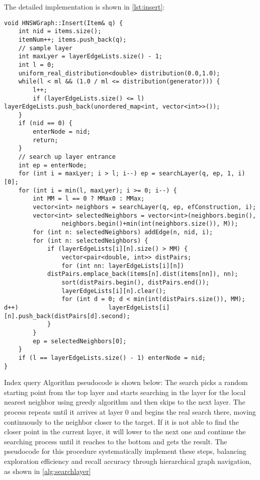 \documentclass[sigconf, nonacm]{acmart}
\begin{document}
The detailed implementation is shown in \ref{lst:insert}:
\begin{lstlisting}[caption={HNSWGraph::Insert}, label={lst:insert}]
void HNSWGraph::Insert(Item& q) {
    int nid = items.size();
    itemNum++; items.push_back(q);
    // sample layer
    int maxLyer = layerEdgeLists.size() - 1;
    int l = 0;
    uniform_real_distribution<double> distribution(0.0,1.0);
    while(l < ml && (1.0 / ml <= distribution(generator))) {
        l++;
        if (layerEdgeLists.size() <= l)		 			   	      		layerEdgeLists.push_back(unordered_map<int, vector<int>>());
    }
    if (nid == 0) {
        enterNode = nid;
        return;
    }
    // search up layer entrance
    int ep = enterNode;
    for (int i = maxLyer; i > l; i--) ep = searchLayer(q, ep, 1, i)[0];
    for (int i = min(l, maxLyer); i >= 0; i--) {
        int MM = l == 0 ? MMax0 : MMax;
        vector<int> neighbors = searchLayer(q, ep, efConstruction, i);
        vector<int> selectedNeighbors = vector<int>(neighbors.begin(),
				neighbors.begin()+min(int(neighbors.size()), M));
        for (int n: selectedNeighbors) addEdge(n, nid, i);
        for (int n: selectedNeighbors) {
            if (layerEdgeLists[i][n].size() > MM) {
                vector<pair<double, int>> distPairs;
                for (int nn: layerEdgeLists[i][n]) 			 	 
			distPairs.emplace_back(items[n].dist(items[nn]), nn);
                sort(distPairs.begin(), distPairs.end());
                layerEdgeLists[i][n].clear();
                for (int d = 0; d < min(int(distPairs.size()), MM); d++) 			             layerEdgeLists[i][n].push_back(distPairs[d].second);
            }
        }
        ep = selectedNeighbors[0];
    }
    if (l == layerEdgeLists.size() - 1) enterNode = nid;
}
\end{lstlisting}

Index query
Algorithm pseudocode is shown below: The search picks a random starting point from the top layer and starts searching in the layer for the local nearest neighbor using greedy algorithm and then skips to the next layer.  The process repeats until it arrives at layer 0 and begins the real search there, moving continuously to the neighbor closer to the target.  If it is not able to find the closer point in the current layer, it will lower to the next one and continue the searching process until it reaches to the bottom and gets the result.
The pseudocode for this procedure systematically implement these steps, balancing exploration efficiency and recall accuracy through hierarchical graph navigation, as shown in \ref{alg:searchlayer}
\end{document}
